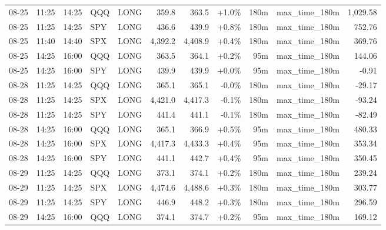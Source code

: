 \documentclass[11pt,a4paper,twoside]{article}
\begin{document}
\begin{center}
\begin{longtable}{>{\color{txtmain}}l l l l l r r r r >{\color{txtmain}}l r}
08-25 & 11:25 & 14:25 & QQQ & LONG & 359.8 & 363.5 & \textcolor{wingreen}{+1.0\%} & 180m & max\_time\_180m & \textcolor{wingreen}{1,029.58} \\
08-25 & 11:25 & 14:25 & SPY & LONG & 436.6 & 439.9 & \textcolor{wingreen}{+0.8\%} & 180m & max\_time\_180m & \textcolor{wingreen}{752.76} \\
08-25 & 11:40 & 14:40 & SPX & LONG & 4,392.2 & 4,408.9 & \textcolor{wingreen}{+0.4\%} & 180m & max\_time\_180m & \textcolor{wingreen}{369.76} \\
08-25 & 14:25 & 16:00 & QQQ & LONG & 363.5 & 364.1 & \textcolor{wingreen}{+0.2\%} & 95m & max\_time\_180m & \textcolor{wingreen}{144.06} \\
08-25 & 14:25 & 16:00 & SPY & LONG & 439.9 & 439.9 & \textcolor{wingreen}{+0.0\%} & 95m & max\_time\_180m & \textcolor{lossred}{-0.91} \\
08-28 & 11:25 & 14:25 & QQQ & LONG & 365.1 & 365.1 & \textcolor{lossred}{-0.0\%} & 180m & max\_time\_180m & \textcolor{lossred}{-29.17} \\
08-28 & 11:25 & 14:25 & SPX & LONG & 4,421.0 & 4,417.3 & \textcolor{lossred}{-0.1\%} & 180m & max\_time\_180m & \textcolor{lossred}{-93.24} \\
08-28 & 11:25 & 14:25 & SPY & LONG & 441.4 & 441.1 & \textcolor{lossred}{-0.1\%} & 180m & max\_time\_180m & \textcolor{lossred}{-82.49} \\
08-28 & 14:25 & 16:00 & QQQ & LONG & 365.1 & 366.9 & \textcolor{wingreen}{+0.5\%} & 95m & max\_time\_180m & \textcolor{wingreen}{480.33} \\
08-28 & 14:25 & 16:00 & SPX & LONG & 4,417.3 & 4,433.3 & \textcolor{wingreen}{+0.4\%} & 95m & max\_time\_180m & \textcolor{wingreen}{353.34} \\
08-28 & 14:25 & 16:00 & SPY & LONG & 441.1 & 442.7 & \textcolor{wingreen}{+0.4\%} & 95m & max\_time\_180m & \textcolor{wingreen}{350.45} \\
08-29 & 11:25 & 14:25 & QQQ & LONG & 373.1 & 374.1 & \textcolor{wingreen}{+0.2\%} & 180m & max\_time\_180m & \textcolor{wingreen}{239.24} \\
08-29 & 11:25 & 14:25 & SPX & LONG & 4,474.6 & 4,488.6 & \textcolor{wingreen}{+0.3\%} & 180m & max\_time\_180m & \textcolor{wingreen}{303.77} \\
08-29 & 11:25 & 14:25 & SPY & LONG & 446.9 & 448.2 & \textcolor{wingreen}{+0.3\%} & 180m & max\_time\_180m & \textcolor{wingreen}{296.59} \\
08-29 & 14:25 & 16:00 & QQQ & LONG & 374.1 & 374.7 & \textcolor{wingreen}{+0.2\%} & 95m & max\_time\_180m & \textcolor{wingreen}{169.12} \\

\end{longtable}
\end{center}
\end{document}
